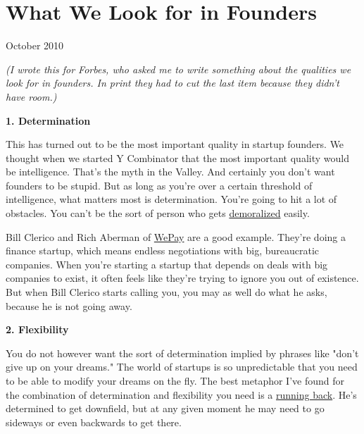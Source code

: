 \chapter{What We Look for in Founders}


            
              
                


                  October 2010


                  
                    \emph{(I wrote this for Forbes, who asked me to write something
                      about the qualities we look for in founders. In print they
                      had to cut the last item because they didn't have
                      room.)}

\textbf{1. Determination}

This has
                    turned out to be the most important quality in startup
                    founders. We thought when we started Y Combinator that the
                    most important quality would be intelligence. That's the
                    myth in the Valley. And certainly you don't want founders to
                    be stupid. But as long as you're over a certain threshold of
                    intelligence, what matters most is determination. You're
                    going to hit a lot of obstacles. You can't be the sort of
                    person who gets
                    \href{http://www.paulgraham.com/die.html}{demoralized} easily.

Bill
                    Clerico and Rich Aberman of
                    \href{http://wepay.com}{WePay} are a good example.
                    They're doing a finance startup, which means endless
                    negotiations with big, bureaucratic companies. When you're
                    starting a startup that depends on deals with big companies
                    to exist, it often feels like they're trying to ignore you
                    out of existence. But when Bill Clerico starts calling you,
                    you may as well do what he asks, because he is not going
                    away.


                    \textbf{2. Flexibility}

You do not however want the
                    sort of determination implied by phrases like "don't give up
                    on your dreams." The world of startups is so unpredictable
                    that you need to be able to modify your dreams on the fly.
                    The best metaphor I've found for the combination of
                    determination and flexibility you need is a
                    \href{http://www.paulgraham.com/relres.html}{running back}. He's determined to
                    get downfield, but at any given moment he may need to go
                    sideways or even backwards to get there.

